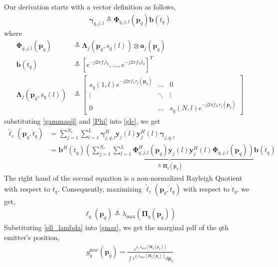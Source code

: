 \documentclass[review]{elsarticle}
\begin{document}
Our derivation starts with a vector definition as follows,
\begin{align}\label{gammaqjl}
    \boldsymbol{\gamma}_{q,j,l}\triangleq\boldsymbol{\Phi}_{q,j,l}(\boldsymbol{p}_q)\boldsymbol{b}(\mathring{t}_q)
\end{align}
where
\begin{align}\label{Phi}
    \boldsymbol{\Phi}_{q,j,l}(\boldsymbol{p}_q)&\triangleq\boldsymbol{\Lambda}_j(\boldsymbol{p}_q,s_q(l))\otimes \boldsymbol{a}_j(\boldsymbol{p}_q)\\
    \boldsymbol{b}(\mathring{t}_q)&\triangleq[e^{-j2\pi f_1\mathring{t}_q},...,e^{-j2\pi f_N\mathring{t}_q}]^T\\
    \boldsymbol{\Lambda}_j(\boldsymbol{p}_q,s_q(l))&\triangleq 
    \left[ 
    \begin{array}{ccc}
        s_q(1,l)e^{-j2\pi f_1\tau_j(\boldsymbol{p}_q)}& \ldots & 0\\
        \vdots&\ddots&\vdots\\
        0&\ldots&s_q(N,l)e^{-j2\pi f_N\tau_j(\boldsymbol{p}_q)}
    \end{array}
    \right ]   
\end{align}
substituting \eqref{gammaqjl} and \eqref{Phi} into \eqref{glc}, we get
\begin{align}
    \tilde{\ell}_c(\boldsymbol{p}_q,\mathring{t}_q)&= \sum_{j=1}^{N_r} \sum_{l=1}^{L} \boldsymbol{\gamma}_{j,q,l}^H\boldsymbol{y}_j(l)\boldsymbol{y}_j^H(l)\boldsymbol{\gamma}_{j,q,l}\\
    &=\boldsymbol{b}^H(\mathring{t}_q)\underbrace{\left(\sum_{j=1}^{N_r} \sum_{l=1}^{L} \boldsymbol{\Phi}^H_{q,j,l}(\boldsymbol{p}_q)\boldsymbol{y}_j(l)\boldsymbol{y}_j^H(l)\boldsymbol{\Phi}_{q,j,l}(\boldsymbol{p}_q)\right)}_{\triangleq\boldsymbol{\Pi}_q(\boldsymbol{p}_q)} \boldsymbol{b}(\mathring{t}_q)
\end{align}
The right hand of the second equation is a non-normalized Rayleigh Quotient with respect to $\mathring{t}_q$. Consequently, maximizing $\tilde{\ell}_c(\boldsymbol{p}_q,\mathring{t}_q)$ with respect to $\mathring{t}_q$, we get,
\begin{align}\label{ell_lambda}
    \ell_q(\boldsymbol{p}_q)\triangleq\lambda_{\text{max}}(\boldsymbol{\Pi}_q(\boldsymbol{p}_q))
\end{align}
Substituting \eqref{ell_lambda} into \eqref{gmar}, we get the marginal pdf of the $q$th emitter's position,
\begin{align}\label{gpq}
    g_{q}^{\text{mar}}(\boldsymbol{p}_q)=\frac{e^{\rho_1\lambda_{\text{max}}(\boldsymbol{\Pi}_q(\boldsymbol{p}_q))}}{\int e^{\rho_1\lambda_{\text{max}}(\boldsymbol{\Pi}_q(\boldsymbol{p}_q))} d\boldsymbol{p}_q}
\end{align}
\end{document}
